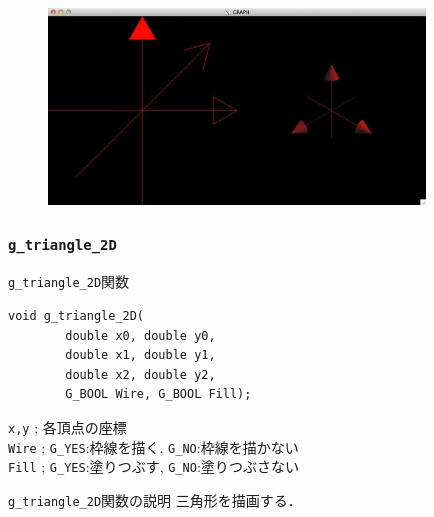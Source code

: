 \documentclass[platex,a4paper,12pt]{jsarticle}%
\begin{document}
\begin{figure}[htb]
	\includegraphics[width=100mm]{./Figures/eps/Canvas_g_arrow2.eps}
\end{figure}




\clearpage
\subsubsection{\texttt{g\_triangle\_2D}}

\begin{itembox}[l]{\texttt{g\_triangle\_2D}関数}
\begin{verbatim}
void g_triangle_2D(        
        double x0, double y0,
        double x1, double y1,
        double x2, double y2,
        G_BOOL Wire, G_BOOL Fill);
\end{verbatim}
\verb|x,y| ; 各頂点の座標\\
\verb|Wire| ; \verb|G_YES|:枠線を描く, \verb|G_NO|:枠線を描かない \\
\verb|Fill| ; \verb|G_YES|:塗りつぶす, \verb|G_NO|:塗りつぶさない 
\end{itembox}

\begin{itembox}[l]{\texttt{g\_triangle\_2D}関数の説明}
三角形を描画する．
\end{itembox}

\begin{figure}[htb]
\end{figure}
\end{document}
